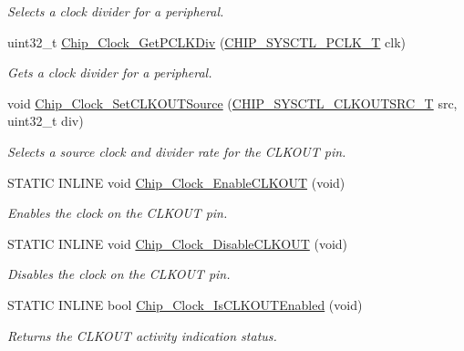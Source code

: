 \begin{DoxyCompactItemize}
\begin{DoxyCompactList}\small\item\em Selects a clock divider for a peripheral. \end{DoxyCompactList}\item 
uint32\+\_\+t \hyperlink{group___c_l_o_c_k__17_x_x__40_x_x_gae547e3a0b782d9ef8135f98bd92fc9e8}{Chip\+\_\+\+Clock\+\_\+\+Get\+P\+C\+L\+K\+Div} (\hyperlink{group___c_l_o_c_k__17_x_x__40_x_x_ga7af78c5752bdd11a908ec9b11e2ecffc}{C\+H\+I\+P\+\_\+\+S\+Y\+S\+C\+T\+L\+\_\+\+P\+C\+L\+K\+\_\+\+T} clk)
\begin{DoxyCompactList}\small\item\em Gets a clock divider for a peripheral. \end{DoxyCompactList}\item 
void \hyperlink{group___c_l_o_c_k__17_x_x__40_x_x_ga0e8ed739d1ffa5480fc028b08a751d28}{Chip\+\_\+\+Clock\+\_\+\+Set\+C\+L\+K\+O\+U\+T\+Source} (\hyperlink{group___c_l_o_c_k__17_x_x__40_x_x_ga157c4adb8f619a3aaf58dacca66a9292}{C\+H\+I\+P\+\_\+\+S\+Y\+S\+C\+T\+L\+\_\+\+C\+L\+K\+O\+U\+T\+S\+R\+C\+\_\+\+T} src, uint32\+\_\+t div)
\begin{DoxyCompactList}\small\item\em Selects a source clock and divider rate for the C\+L\+K\+O\+U\+T pin. \end{DoxyCompactList}\item 
S\+T\+A\+T\+I\+C I\+N\+L\+I\+N\+E void \hyperlink{group___c_l_o_c_k__17_x_x__40_x_x_ga6b9661b89b2284e6f09af0e77303f9d2}{Chip\+\_\+\+Clock\+\_\+\+Enable\+C\+L\+K\+O\+U\+T} (void)
\begin{DoxyCompactList}\small\item\em Enables the clock on the C\+L\+K\+O\+U\+T pin. \end{DoxyCompactList}\item 
S\+T\+A\+T\+I\+C I\+N\+L\+I\+N\+E void \hyperlink{group___c_l_o_c_k__17_x_x__40_x_x_ga87c79d2ff63948102a6addd4222c4879}{Chip\+\_\+\+Clock\+\_\+\+Disable\+C\+L\+K\+O\+U\+T} (void)
\begin{DoxyCompactList}\small\item\em Disables the clock on the C\+L\+K\+O\+U\+T pin. \end{DoxyCompactList}\item 
S\+T\+A\+T\+I\+C I\+N\+L\+I\+N\+E bool \hyperlink{group___c_l_o_c_k__17_x_x__40_x_x_ga01120c20f4485599176f9b46a34b70fe}{Chip\+\_\+\+Clock\+\_\+\+Is\+C\+L\+K\+O\+U\+T\+Enabled} (void)
\begin{DoxyCompactList}\small\item\em Returns the C\+L\+K\+O\+U\+T activity indication status. \end{DoxyCompactList}\item 

\end{DoxyCompactItemize}
